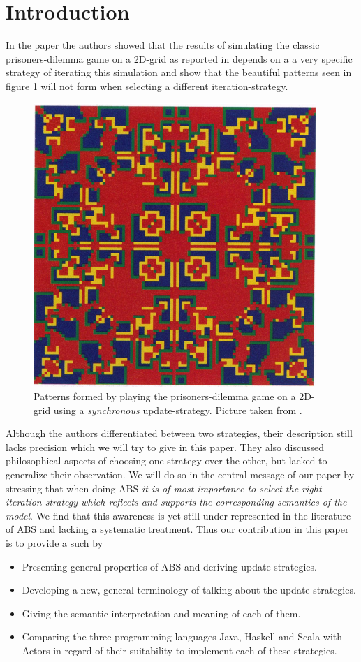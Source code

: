 \section{Introduction}
In the paper \cite{huberman_evolutionary_1993} the authors showed that the results of simulating the classic prisoners-dilemma game on a 2D-grid as reported in \cite{nowak_evolutionary_1992} depends on a a very specific strategy of iterating this simulation and show that the beautiful patterns seen in figure \ref{fig:sync_patterns} will not form when selecting a different iteration-strategy.

\begin{figure}[H]
	\centering
  \includegraphics[width=.4\textwidth, angle=0]{./fig/sync_patterns.png}
	\caption{Patterns formed by playing the prisoners-dilemma game on a 2D-grid using a \textit{synchronous} update-strategy. Picture taken from \cite{huberman_evolutionary_1993}.}
	\label{fig:sync_patterns}
\end{figure}

Although the authors differentiated between two strategies, their description still lacks precision which we will try to give in this paper. They also discussed philosophical aspects of choosing one strategy over the other, but lacked to generalize their observation. We will do so in the central message of our paper by stressing that when doing ABS \textit{it is of most importance to select the right iteration-strategy which reflects and supports the corresponding semantics of the model}. We find that this awareness is yet still under-represented in the literature of ABS and lacking a systematic treatment. Thus our contribution in this paper is to provide a such by
\begin{itemize}
	\item Presenting general properties of ABS and deriving update-strategies.
	\item Developing a new, general terminology of talking about the update-strategies.
	\item Giving the semantic interpretation and meaning of each of them.
	\item Comparing the three programming languages Java, Haskell and Scala with Actors in regard of their suitability to implement each of these strategies.
\end{itemize}

